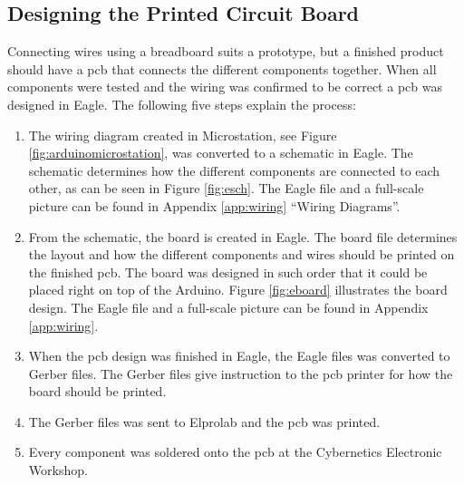 \subsection{Designing the Printed Circuit Board}
Connecting wires using a breadboard suits a prototype, but a finished product should have a \acrshort{pcb} that connects the different components together. When all components were tested and the wiring was confirmed to be correct a \acrshort{pcb} was designed in Eagle. The following five steps explain the process:
\begin{enumerate}[1.]
\item The wiring diagram created in Microstation, see Figure \ref{fig:arduinomicrostation}, was converted to a schematic in Eagle. The schematic determines how the different components are connected to each other, as can be seen in Figure \ref{fig:esch}. The Eagle file and a full-scale picture can be found in Appendix \ref{app:wiring} ``Wiring Diagrams''.
\item From the schematic, the board is created in Eagle. The board file determines the layout and how the different components and wires should be printed on the finished \acrshort{pcb}. The board was designed in such order that it could be placed right on top of the Arduino. Figure \ref{fig:eboard} illustrates the board design. The Eagle file and a full-scale picture can be found in Appendix \ref{app:wiring}.
\item When the \acrshort{pcb} design was finished in Eagle, the Eagle files was converted to Gerber files. The Gerber files give instruction to the \acrshort{pcb} printer for how the board should be printed.
\item The Gerber files was sent to Elprolab and the \acrshort{pcb} was printed.
\item Every component was soldered onto the \acrshort{pcb} at the Cybernetics Electronic Workshop.
\end{enumerate}